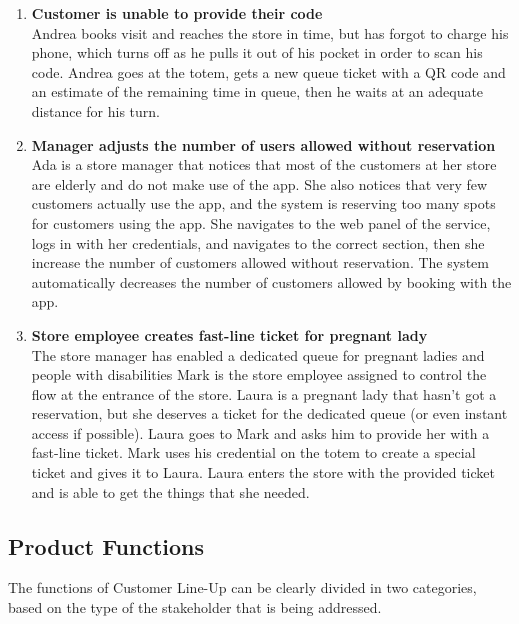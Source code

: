 \begin{enumerate}[label=\Alph*.]
        \item \textbf{Customer is unable to provide their code}\\
            Andrea books visit and reaches the store in time, but has forgot to charge his phone, which turns off as he pulls it out of his pocket in order to scan his code.
            Andrea goes at the totem, gets a new queue ticket with a QR code and an estimate of the remaining time in queue, then he waits at an adequate distance for his turn.
        \item \textbf{Manager adjusts the number of users allowed without reservation}\\
            Ada is a store manager that notices that most of the customers at her store are elderly and do not make use of the app. She also notices that very few
            customers actually use the app, and the system is reserving too many spots for customers using the app. She navigates to the web panel of the service,
            logs in with her credentials, and navigates to the correct section, then she increase the number of customers allowed without reservation. The system
            automatically decreases the number of customers allowed by booking with the app.
        \item \textbf{Store employee creates fast-line ticket for pregnant lady}\\
            The store manager has enabled a dedicated queue for pregnant ladies and people with disabilities
            Mark is the store employee assigned to control the flow at the entrance of the store. Laura is a pregnant lady that hasn't got a reservation, but she deserves a ticket for the dedicated queue (or even instant access if possible). Laura goes to Mark and asks him to provide her with a fast-line ticket. Mark uses his credential on the totem to create a special ticket and gives it to Laura. Laura enters the store with the provided ticket and is able to get the things that she needed.         
        \end{enumerate}
\subsection{Product Functions}
The functions of Customer Line-Up can be clearly divided in two categories, based on the type of the stakeholder that is being addressed.


